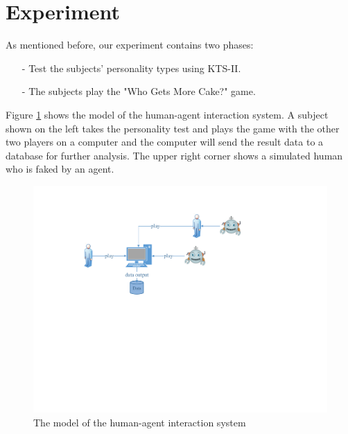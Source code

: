 


\section{Experiment}
\label{ch4:exp}
As mentioned before, our experiment contains two phases: 
\begin{itemize}
\item[-]Test the subjects' personality types using KTS-II.
\item[-]The subjects play the "Who Gets More Cake?" game. 
\end{itemize}
Figure \ref{ch4:fmodelhai} shows the model of the human-agent interaction system. A subject shown on the left takes the personality test and plays the game with the other two players on a computer and the computer will send the result data to a database for further analysis. The upper right corner shows a simulated human who is faked by an agent. 

\begin{figure}
\centering
\includegraphics[scale=0.8]{chap4/chap4-model.pdf}
\caption{The model of the human-agent interaction system}
\label{ch4:fmodelhai}
\end{figure}

